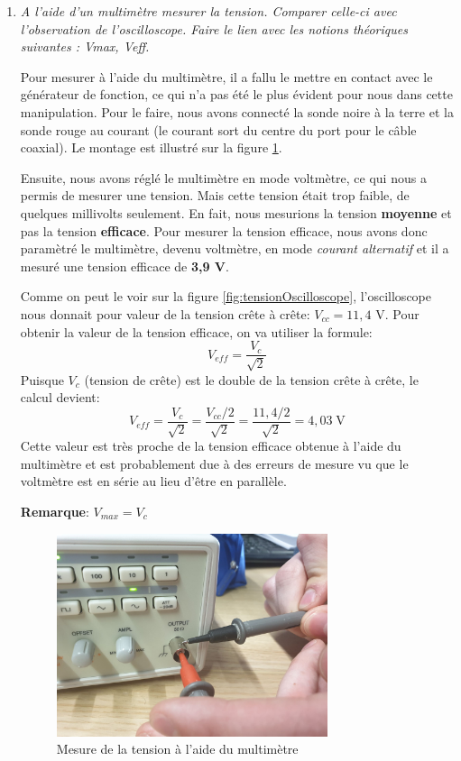 \documentclass[a4paper]{article}
\begin{document}
\begin{enumerate}
\item \textit{A l'aide d'un multimètre mesurer la tension. Comparer celle-ci avec l'observation de l'oscilloscope. Faire le lien avec les notions théoriques suivantes : Vmax, Veff.}

  Pour mesurer à l'aide du multimètre, il a fallu le mettre en contact avec le générateur de fonction, ce qui n'a pas été le plus évident pour nous dans cette manipulation. Pour le faire, nous avons connecté la sonde noire à la terre et la sonde rouge au courant (le courant sort du centre du port pour le câble coaxial). Le montage est illustré sur la figure \ref{fig:multimetreMesure}.
  
  Ensuite, nous avons réglé le multimètre en mode voltmètre, ce qui nous a permis de mesurer une tension. Mais cette tension était trop faible, de quelques millivolts seulement. En fait, nous mesurions la tension \textbf{moyenne} et pas la tension \textbf{efficace}. Pour mesurer la tension efficace, nous avons donc paramètré le multimètre, devenu voltmètre, en mode \textit{courant alternatif} et il a mesuré une tension efficace de \textbf{3,9 V}.

  Comme on peut le voir sur la figure \ref{fig:tensionOscilloscope}, l'oscilloscope nous donnait pour valeur de la tension crête à crête: $ V_{cc} = 11,4 $ V. Pour obtenir la valeur de la tension efficace, on va utiliser la formule:
  \[ V_{eff} = \frac{V_c}{\sqrt{2}} \]
  Puisque $ V_c $ (tension de crête) est le double de la tension crête à crête, le calcul devient:
  \[ V_{eff} = \frac{V_c}{\sqrt{2}} = \frac{V_{cc} / 2}{\sqrt{2}} = \frac{11,4 / 2}{\sqrt{2}} = 4,03 \; \text{V} \]
  Cette valeur est très proche de la tension efficace obtenue à l'aide du multimètre et est probablement due à des erreurs de mesure vu que le voltmètre est en série au lieu d'être en parallèle.

  \textbf{Remarque}: $ V_{max} = V_c $

\begin{figure}%
  \centering
  \includegraphics[width=0.75\textwidth]{multimetre-mesure01.jpg}
  \caption{Mesure de la tension à l'aide du multimètre}
  \label{fig:multimetreMesure}
\end{figure}


\end{enumerate}
\end{document}
